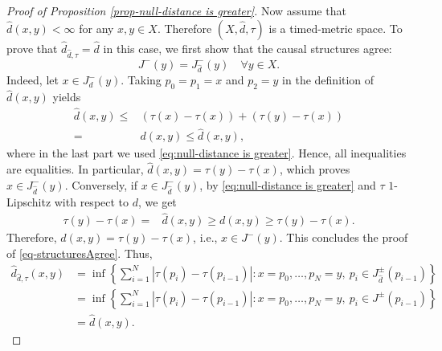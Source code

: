 \documentclass[10pt,a4paper]{amsart}
\begin{document}
\begin{proof}[Proof of Proposition \ref{prop-null-distance is greater}]
Now assume that $\hat{d}(x,y)<\infty$ for any $x,y\in X$. Therefore $(X,\hat{d},\tau)$ is a timed-metric space. To prove that $\hat{d}_{\hat{d},\tau}= \hat d$ in this case, we first show that the causal structures agree:
\begin{equation}\label{eq-structuresAgree}
    J^-(y)=J^-_{\hat{d}}(y) \quad \forall y \in X. 
\end{equation}
Indeed, let $x\in J^-_{d}(y)$. Taking $p_0 = p_1 = x$ and $p_2 = y$ in the definition of $\hat{d}(x,y)$ yields 
\begin{align*}
\hat{d}(x,y) \leq & (\tau(x)-\tau(x)) + (\tau(y) - \tau(x)) \\
= & d(x,y) \leq \hat{d}(x,y), 
\end{align*}
where in the last part we used \eqref{eq:null-distance is greater}.
Hence, all inequalities are equalities. In particular,  $\hat{d}(x,y) = \tau(y)-\tau(x)$, which proves $x\in J^-_{\hat{d}}(y)$.  Conversely, if $x\in J^-_{\hat{d}}(y)$, by \eqref{eq:null-distance is greater} and $\tau$  $1$-Lipschitz with respect to $d$, we get
\begin{align*}
\tau(y) - \tau(x) = & \hat{d}(x,y)  
\geq  d(x,y) \geq \tau(y)-\tau(x).
\end{align*}
Therefore, $d(x,y) = \tau(y)-\tau(x)$, i.e., 
$x\in J^-(y)$. This concludes the proof of \eqref{eq-structuresAgree}. Thus, 
\begin{align*}
\hat{d}_{\hat{d}, \tau}(x,y) 
&= \inf\left\{\sum_{i=1}^{N} |\tau(p_i)-\tau(p_{i-1})| : x=p_0,\dots, p_{N}=y,\ p_{i}\in J^\pm_{\hat{d}}(p_{i-1})\right\}\\
&= \inf\left\{\sum_{i=1}^{N} |\tau(p_i)-\tau(p_{i-1})| : x=p_0,\dots, p_{N}=y,\ p_{i}\in J^\pm(p_{i-1})\right\}\\
&= \hat{d}(x,y).
\end{align*}
\end{proof}
\end{document}
